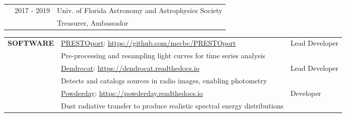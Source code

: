 \documentclass{article}
\begin{document}

\vspace{0.25cm}
\begin{tabular}{p{4cm}p{2.2cm}l}
    &2017 - 2019 & Univ. of Florida Astronomy and Astrophysics Society \\
    &             & \small Treasurer, Ambassador
\end{tabular}

\vspace{0.5cm}


\thispagestyle{empty}









\begin{tabular}{p{4cm}ll}
    \large{\textbf{SOFTWARE}} &\href{https://github.com/mccbc/PRESTOport}{PRESTOport}: \href{https://github.com/mccbc/PRESTOport}{https://github.com/mccbc/PRESTOport} &  Lead Developer\\
    &\small Pre-processing and resampling light curves for time series analysis & \vspace{0.25cm} \\
    &\href{https://github.com/cmcclellan1010/dendrocat
}{Dendrocat}: \href{https://dendrocat.readthedocs.io}{https://dendrocat.readthedocs.io} & Lead Developer \\
    &\small Detects and catalogs sources in radio images, enabling photometry & \vspace{0.25cm} \\
    &\href{https://powderday.readthedocs.io/en/latest/index.html}{Powderday}: \href{https://powderday.readthedocs.io/en/latest/index.html}{https://powderday.readthedocs.io} & Developer \\ 
    &\small Dust radiative transfer to produce realistic spectral energy distributions & \\
\end{tabular}
\vspace{0.5cm}
\end{document}
